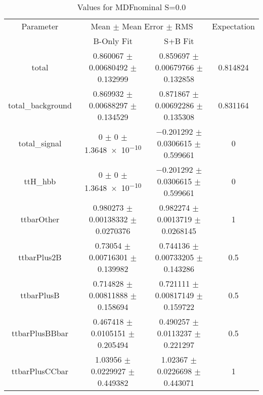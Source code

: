 \begin{table}
\centering
\caption{Values for MDFnominal S=0.0}
\begin{tabular}{cccc}
\toprule
Parameter & \multicolumn{2}{c}{Mean $\pm$ Mean Error $\pm$ RMS} & Expectation\\
 & B-Only Fit & S+B Fit & \\
\midrule
total & \num{0.860067} $\pm$ \num{0.00680492} $\pm$ \num{0.132999} & \num{0.859697} $\pm$ \num{0.00679766} $\pm$ \num{0.132858} & \num{0.814824}\\
total\_background & \num{0.869932} $\pm$ \num{0.00688297} $\pm$ \num{0.134529} & \num{0.871867} $\pm$ \num{0.00692286} $\pm$ \num{0.135308} & \num{0.831164}\\
total\_signal & \num{0} $\pm$ \num{0} $\pm$ \num{1.3648e-10} & \num{-0.201292} $\pm$ \num{0.0306615} $\pm$ \num{0.599661} & \num{0}\\
ttH\_hbb & \num{0} $\pm$ \num{0} $\pm$ \num{1.3648e-10} & \num{-0.201292} $\pm$ \num{0.0306615} $\pm$ \num{0.599661} & \num{0}\\
ttbarOther & \num{0.980273} $\pm$ \num{0.00138332} $\pm$ \num{0.0270376} & \num{0.982274} $\pm$ \num{0.0013719} $\pm$ \num{0.0268145} & \num{1}\\
ttbarPlus2B & \num{0.73054} $\pm$ \num{0.00716301} $\pm$ \num{0.139982} & \num{0.744136} $\pm$ \num{0.00733205} $\pm$ \num{0.143286} & \num{0.5}\\
ttbarPlusB & \num{0.714828} $\pm$ \num{0.00811888} $\pm$ \num{0.158694} & \num{0.721111} $\pm$ \num{0.00817149} $\pm$ \num{0.159722} & \num{0.5}\\
ttbarPlusBBbar & \num{0.467418} $\pm$ \num{0.0105151} $\pm$ \num{0.205494} & \num{0.490257} $\pm$ \num{0.0113237} $\pm$ \num{0.221297} & \num{0.5}\\
ttbarPlusCCbar & \num{1.03956} $\pm$ \num{0.0229927} $\pm$ \num{0.449382} & \num{1.02367} $\pm$ \num{0.0226698} $\pm$ \num{0.443071} & \num{1}\\
\bottomrule
\end{tabular}
\end{table}